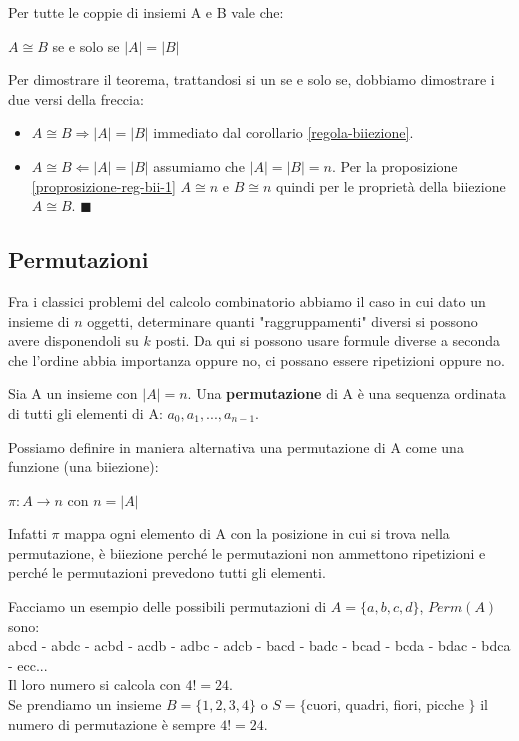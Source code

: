 \begin{theorem}
Per tutte le coppie di insiemi A e B vale che:
\begin{center}
    $A \cong B$ se e solo se $|A| = |B|$
\end{center}
\end{theorem}
\begin{demostration}
    Per dimostrare il teorema, trattandosi si un se e solo se, dobbiamo dimostrare i due versi della freccia:
    \begin{itemize}
        \item $A \cong B \Longrightarrow |A| = |B|$ immediato dal corollario \ref{regola-biiezione}.
        \item $A \cong B \Longleftarrow |A| = |B|$ assumiamo che $|A| = |B| = n$. Per la proposizione \ref{proprosizione-reg-bii-1} $A \cong n$ e $B \cong n$ quindi per le proprietà della biiezione $A \cong B$. $\blacksquare$
    \end{itemize}
\end{demostration}

\subsection{Permutazioni}
Fra i classici problemi del calcolo combinatorio abbiamo il caso in cui dato un insieme di $n$ oggetti, determinare quanti "raggruppamenti" diversi si possono avere disponendoli su $k$ posti. Da qui si possono usare formule diverse a seconda che l'ordine abbia importanza oppure no, ci possano essere ripetizioni oppure no.
\begin{definition}[Permutazione]
    Sia A un insieme con $|A| = n$. Una \textbf{permutazione} di A è una sequenza ordinata di tutti gli elementi di A: $a_0, a_1, ..., a_{n-1}$.
\end{definition}

\hspace{-15pt}Possiamo definire in maniera alternativa una permutazione di A come una funzione (una biiezione):
\begin{center}
    $\pi: A \to n$ con $n = |A|$
\end{center}
Infatti $\pi$ mappa ogni elemento di A con la posizione in cui si trova nella permutazione, è biiezione perché le permutazioni non ammettono ripetizioni e perché le permutazioni prevedono tutti gli elementi.

\begin{example}
Facciamo un esempio delle possibili permutazioni di $A = \{a,b,c,d\}$, $Perm(A)$ sono:\\
abcd - abdc - acbd - acdb - adbc - adcb - bacd - badc - bcad - bcda - bdac - bdca - ecc...\\
Il loro numero si calcola con $4! = 24$.\\
Se prendiamo un insieme $B = \{1,2,3,4\}$ o $S = \{$cuori, quadri, fiori, picche $\}$ il numero di permutazione è sempre $4! = 24$.
\end{example}

